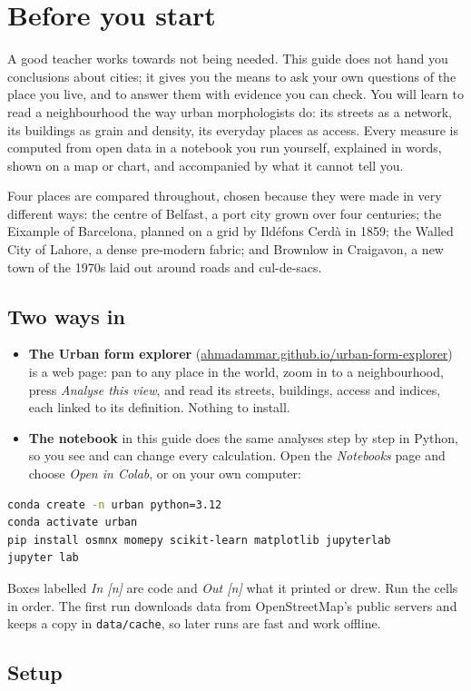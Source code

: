\chapter{Before you start}\label{ch:start}

A good teacher works towards not being needed. This guide does not hand you conclusions about cities; it gives you the means to ask your own questions of the place you live, and to answer them with evidence you can check. You will learn to read a neighbourhood the way urban morphologists do: its streets as a network, its buildings as grain and density, its everyday places as access. Every measure is computed from open data in a notebook you run yourself, explained in words, shown on a map or chart, and accompanied by what it cannot tell you.

Four places are compared throughout, chosen because they were made in very different ways: the centre of Belfast, a port city grown over four centuries; the Eixample of Barcelona, planned on a grid by Ild\'efons Cerd\`a in 1859; the Walled City of Lahore, a dense pre-modern fabric; and Brownlow in Craigavon, a new town of the 1970s laid out around roads and cul-de-sacs.

\section{Two ways in}
\begin{itemize}
\item \textbf{The Urban form explorer} (\href{https://ahmadammar.github.io/urban-form-explorer/}{ahmadammar.github.io/urban-form-explorer}) is a web page: pan to any place in the world, zoom in to a neighbourhood, press \emph{Analyse this view}, and read its streets, buildings, access and indices, each linked to its definition. Nothing to install.
\item \textbf{The notebook} in this guide does the same analyses step by step in Python, so you see and can change every calculation. Open the \emph{Notebooks} page and choose \emph{Open in Colab}, or on your own computer:
\end{itemize}
\begin{lstlisting}[language=bash]
conda create -n urban python=3.12
conda activate urban
pip install osmnx momepy scikit-learn matplotlib jupyterlab
jupyter lab
\end{lstlisting}
Boxes labelled \emph{In [n]} are code and \emph{Out [n]} what it printed or drew. Run the cells in order. The first run downloads data from OpenStreetMap's public servers and keeps a copy in \texttt{data/cache}, so later runs are fast and work offline.

\section{Setup}

